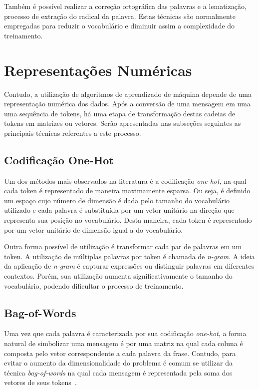 Também é possível realizar a correção ortográfica das palavras e a lematização, processo de extração do radical da
palavra.
Estas técnicas são normalmente empregadas para reduzir o vocabulário e diminuir assim a complexidade do treinamento.

\section{Representações Numéricas}

Contudo, a utilização de algoritmos de aprendizado de máquina depende de uma representação numérica dos dados.
Após a conversão de uma mensagem em uma uma sequência de tokens, há uma etapa de transformação destas cadeias
de tokens em matrizes ou vetores.
Serão apresentadas nas subseções seguintes as principais técnicas referentes a este processo.

\subsection{Codificação One-Hot}

Um dos métodos mais observados na literatura é a codificação \textit{one-hot}, na qual cada token é representado de
maneira maximamente esparsa.
Ou seja, é definido um espaço cujo número de dimensão é dada pelo tamanho do vocabulário utilizado e cada palavra é
substituída por um vetor unitário na direção que representa sua posição no vocabulário.
Desta maneira, cada token é representado por um vetor unitário de dimensão igual a do vocabulário.

Outra forma possível de utilização é transformar cada par de palavras em um token.
A utilização de múltiplas palavras por token é chamada de \textit{n-gram}.
A ideia da aplicação de \textit{n-gram} é capturar expressões ou distinguir palavras em diferentes contextos.
Porém, sua utilização aumenta significativamente o tamanho do vocabulário, podendo dificultar o processo de treinamento.

\subsection{Bag-of-Words}

Uma vez que cada palavra é caracterizada por sua codificação \textit{one-hot}, a forma natural de simbolizar uma mensagem
é por uma matriz na qual cada coluna é composta pelo vetor correspondente a cada palavra da frase.
Contudo, para evitar o aumento da dimensionalidade do problema é comum se utilizar da técnica \textit{bag-of-words} na
qual cada mensagem é representada pela soma dos vetores de seus tokens~\cite{schutze08}.

